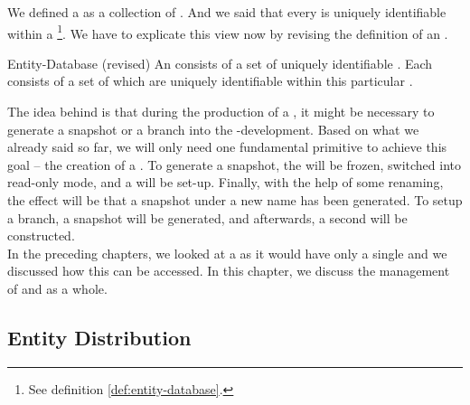 \documentclass[a4paper, 12pt]{book}
\begin{document}
We defined a  as a collection of . And we
said that every  is uniquely identifiable within a
\footnote{See definition \vref{def:entity-database}.}. We
have to explicate this view now by revising the definition of an
.
\begin{definition*}{Entity-Database (revised)}
  \label{def:entity-database-2}
  An  consists of a set of uniquely identifiable
  . Each  consists of a set of  which
  are uniquely identifiable within this particular
  .
\end{definition*}
%
The idea behind  is that during the production of a
, it might be necessary to generate a snapshot or a
branch into the -development. 
%
Based on what we already said so far, we will only need one
fundamental primitive to achieve this goal -- the creation of a
.
%
To generate a snapshot, the  will be frozen, switched
into read-only mode, and a  will be
set-up. Finally, with the help of some renaming, the effect will be
that a snapshot under a new name has been generated. To setup a
branch, a snapshot will be generated, and afterwards, a second
 will be constructed.\\
%
In the preceding chapters, we looked at a  as it would have only
a single  and we discussed how this  can be
accessed.
%
In this chapter, we discuss the management of  and
 as a whole. 

\subsection{Entity Distribution}
\end{document}
